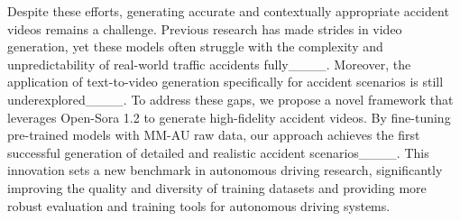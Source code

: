 Despite these efforts, generating accurate and contextually appropriate accident videos remains a challenge. Previous research has made strides in video generation, yet these models often struggle with the complexity and unpredictability of real-world traffic accidents fully____. Moreover, the application of text-to-video generation specifically for accident scenarios is still underexplored____. To address these gaps, we propose a novel framework that leverages Open-Sora 1.2 to generate high-fidelity accident videos. By fine-tuning pre-trained models with MM-AU raw data, our approach achieves the first successful generation of detailed and realistic accident scenarios____. This innovation sets a new benchmark in autonomous driving research, significantly improving the quality and diversity of training datasets and providing more robust evaluation and training tools for autonomous driving systems.